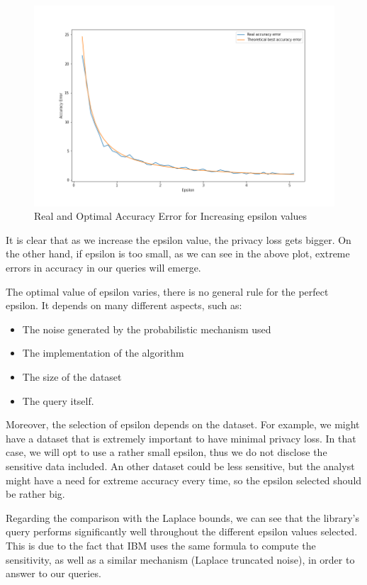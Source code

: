 \begin{figure}[!htb]\centering
    \includegraphics[width=1\textwidth]{images/epsilon_measurements.png}
    \caption{Real and Optimal Accuracy Error for Increasing epsilon values}
\end{figure}

It is clear that as we increase the epsilon value, the privacy loss gets bigger. On the other hand, if epsilon is too small, as we can see in the above plot, extreme errors in accuracy in our queries will emerge. 

The optimal value of epsilon varies, there is no general rule for the perfect epsilon. It depends on many different aspects, such as:

\begin{itemize}
    \item The noise generated by the probabilistic mechanism used
    \item The implementation of the algorithm
    \item The size of the dataset
    \item The query itself.
\end{itemize}

Moreover, the selection of epsilon depends on the dataset. For example, we might have a dataset that is extremely important to have minimal privacy loss. In that case, we will opt to use a rather small epsilon, thus we do not disclose the sensitive data included. An other dataset could be less sensitive, but the analyst might have a need for extreme accuracy every time, so the epsilon selected should be rather big.

Regarding the comparison with the Laplace bounds, we can see that the library's query performs significantly well throughout the different epsilon values selected. This is due to the fact that IBM uses the same formula to compute the sensitivity, as well as a similar mechanism (Laplace truncated noise), in order to answer to our queries.

